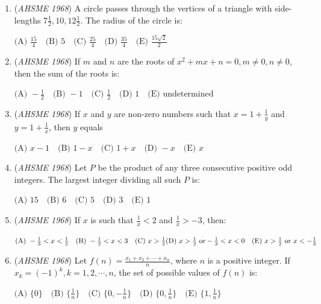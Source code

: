 \begin{enumerate}
 $\text{(A) } 16:9\quad \text{(B) } 9:16\quad \text{(C) } 4:3\quad \text{(D) } 3:4\quad \text{(E) } \text{none of these}$


	\item (\textit{AHSME 1968}) A circle passes through the vertices of a triangle with side-lengths $7\frac{1}{2},10,12\frac{1}{2}.$ The radius of the circle is:


 $\text{(A) } \frac{15}{4}\quad \text{(B) } 5\quad \text{(C) } \frac{25}{4}\quad \text{(D) } \frac{35}{4}\quad \text{(E) } \frac{15\sqrt{2}}{2}$


	\item (\textit{AHSME 1968}) If $m$ and $n$ are the roots of $x^2+mx+n=0 ,m \ne 0,n \ne 0$, then the sum of the roots is:


 $\text{(A) } -\frac{1}{2}\quad \text{(B) } -1\quad \text{(C) } \frac{1}{2}\quad \text{(D) } 1\quad \text{(E) } \text{undetermined}$


	\item (\textit{AHSME 1968}) If $x$ and $y$ are non-zero numbers such that $x=1+\frac{1}{y}$ and $y=1+\frac{1}{x}$, then $y$ equals


 $\text{(A) } x-1\quad \text{(B) } 1-x\quad \text{(C) } 1+x\quad \text{(D) } -x\quad \text{(E) } x$


	\item (\textit{AHSME 1968}) Let $P$ be the product of any three consecutive positive odd integers. The largest integer dividing all such $P$ is:


 $\text{(A) } 15\quad \text{(B) } 6\quad \text{(C) } 5\quad \text{(D) } 3\quad \text{(E) } 1$


	\item (\textit{AHSME 1968}) If $x$ is such that $\frac{1}{x}<2$ and $\frac{1}{x}>-3$, then:


 $\text{(A) } -\frac{1}{3}<x<\frac{1}{2}\quad \text{(B) } -\frac{1}{2}<x<3\quad \text{(C) } x>\frac{1}{2}\quad\\ \text{(D) } x>\frac{1}{2} \text{ or} -\frac{1}{3}<x<0\quad \text{(E) } x>\frac{1}{2} \text{ or } x<-\frac{1}{3}$


	\item (\textit{AHSME 1968}) Let $f(n)=\frac{x_1+x_2+\cdots +x_n}{n}$, where $n$ is a positive integer. If $x_k=(-1)^k, k=1,2,\cdots ,n$, the set of possible values of $f(n)$ is:


 $\text{(A) } \{0\}\quad \text{(B) } \{\frac{1}{n}\}\quad \text{(C) } \{0,-\frac{1}{n}\}\quad \text{(D) } \{0,\frac{1}{n}\}\quad \text{(E) } \{1,\frac{1}{n}\}$



\end{enumerate}
